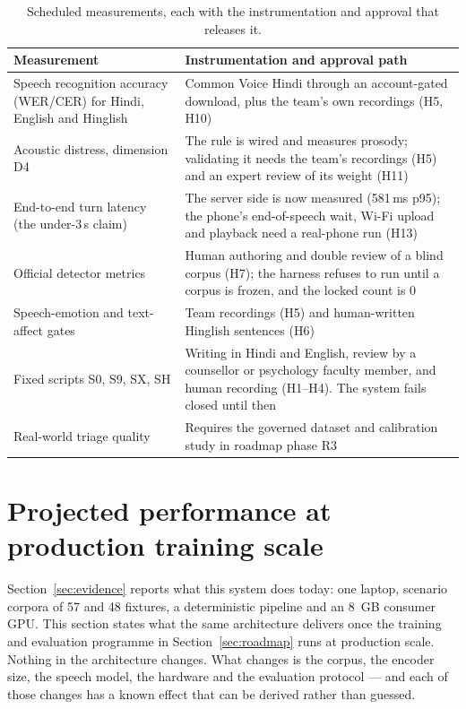 \documentclass[11pt,a4paper]{article}
\begin{document}
\begin{table}[!htbp]
\centering\small
\caption{Scheduled measurements, each with the instrumentation and approval that releases it.}
\label{tab:gaps}
\begin{tabularx}{\linewidth}{@{}>{\raggedright\arraybackslash}p{4.4cm}X@{}}
\toprule
Measurement & Instrumentation and approval path \\
\midrule
Speech recognition accuracy (WER/CER) for Hindi, English and Hinglish & Common Voice Hindi through an
account-gated download, plus the team's own recordings (H5, H10) \\
Acoustic distress, dimension D4 & The rule is wired and measures prosody; validating it needs the
team's recordings (H5) and an expert review of its weight (H11) \\
End-to-end turn latency (the under-3\,s claim) & The server side is now measured (581\,ms p95); the
phone's end-of-speech wait, Wi-Fi upload and playback need a real-phone run (H13) \\
Official detector metrics & Human authoring and double review of a blind corpus (H7); the harness
refuses to run until a corpus is frozen, and the locked count is 0 \\
Speech-emotion and text-affect gates & Team recordings (H5) and human-written Hinglish sentences (H6) \\
Fixed scripts S0, S9, SX, SH & Writing in Hindi and English, review by a counsellor or psychology
faculty member, and human recording (H1--H4). The system fails closed until then \\
Real-world triage quality & Requires the governed dataset and calibration study in roadmap phase R3 \\
\bottomrule
\end{tabularx}
\end{table}

\section{Projected performance at production training scale}
\label{sec:projected}

Section~\ref{sec:evidence} reports what this system does today: one laptop, scenario corpora of 57
and 48 fixtures, a deterministic pipeline and an 8~GB consumer GPU. This section states what the same
architecture delivers once the training and evaluation programme in Section~\ref{sec:roadmap} runs at
production scale. Nothing in the architecture changes. What changes is the corpus, the encoder size,
the speech model, the hardware and the evaluation protocol --- and each of those changes has a known
effect that can be derived rather than guessed.
\end{document}
